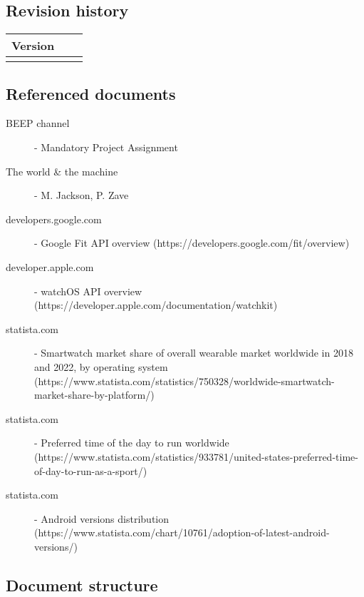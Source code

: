 \documentclass[../main.tex]{subfiles}
\begin{document}
\subsection{Revision history}

	\begin{tabular}{p{1.2cm}|p{2.1cm}|p{2.6cm}}
		\bf Version & \bf \makebox[2.1cm][c]{Release Date} & \bf \makebox[3cm][c]{Description} \\
		\hline
		\makebox[1.2cm][c]{1.0} & \makebox[2.1cm][c]{11/10/2017} & \makebox[3cm][c]{Initial Release}\\
	\end{tabular}

\subsection{Referenced documents}

\begin{minipage}{\textwidth}
\begin{description}
	\item [BEEP channel] - Mandatory Project Assignment
	\item [The world \& the machine] - M. Jackson, P. Zave
	\item [developers.google.com] - Google Fit API overview (https://developers.google.com/fit/overview)
	\item [developer.apple.com] - watchOS API overview (https://developer.apple.com/documentation/watchkit)
	\item [statista.com] - Smartwatch market share of overall wearable market worldwide in 2018 and 2022, by operating system (https://www.statista.com/statistics/750328/worldwide-smartwatch-market-share-by-platform/)
	\item [statista.com] - Preferred time of the day to run worldwide (https://www.statista.com/statistics/933781/united-states-preferred-time-of-day-to-run-as-a-sport/)
	\item [statista.com] - Android versions distribution (https://www.statista.com/chart/10761/adoption-of-latest-android-versions/)
\end{description}
\end{minipage}

\subsection{Document structure}
\end{document}
